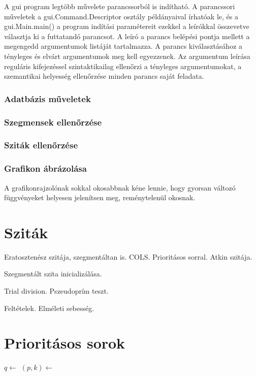 A gui program legtöbb művelete parancssorból is indítható.
A parancssori műveletek a gui.Command.Descriptor osztály példányaival írhatóak le, és a gui.Main.main() a program indítási paramétereit ezekkel a leírókkal összevetve választja ki a futtatandó parancsot.
A leíró a parancs belépési pontja mellett a megengedd argumentumok listáját tartalmazza. A parancs kiválasztásához a tényleges és elvárt argumentumok meg kell egyezzenek.
Az argumentum leírása reguláris kifejezéssel szintaktikailag ellenőrzi a tényleges argumentumokat, a szemantikai helyesség ellenőrzése minden parancs saját feladata.

\subsubsection{Adatbázis műveletek}

\subsubsection{Szegmensek ellenőrzése}

\subsubsection{Sziták ellenőrzése}

\subsubsection{Grafikon ábrázolása}

A grafikonrajzolónak sokkal okosabbnak kéne lennie, hogy gyorsan változó függvényeket
helyesen jelenítsen meg, reménytelenül okosnak.

\section{Sziták}

Eratosztenész szitája, szegmentáltan is. COLS. Prioritásos sorral. Atkin szitája.

Szegmentált szita inicializálása.

Trial division. Pszeudoprím teszt.

Feltételek. Elméleti sebesség.

\section{Prioritásos sorok}

\begin{algorithmic}[1]
\State $q \gets$ 
		\State $(p, k) \gets $ 
		\State {}
		\State {}
	\EndWhile
		\State {}
	\EndIf
\EndFor
\end{algorithmic}

